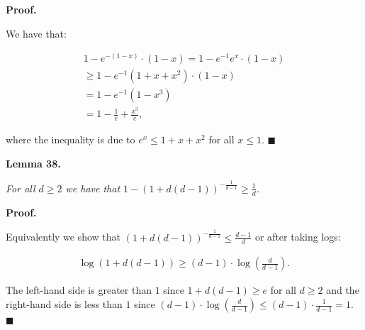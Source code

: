 


\par\medskip\noindent\textbf{Proof.}\par



We have that:\par


\[\begin{gathered}
\displaystyle 1-e^{-(1-x)}\cdot(1-x) \displaystyle=1-e^{-1}e^{x}\cdot(1-x) \\
\displaystyle\geq 1-e^{-1}(1+x+x^{2})\cdot(1-x) \\
\displaystyle=1-e^{-1}(1-x^{3}) \\
\displaystyle=1-\frac{1}{e}+\frac{x^{3}}{e},
\end{gathered}\]


where the inequality is due to $e^{x}\leq 1+x+x^{2}$ for all $x\leq 1$.
\ensuremath{\blacksquare}\par






\par\medskip\noindent\textbf{\textbf{Lemma 38}\textbf{.}}\par



\emph{For all $d\geq 2$ we have that $1-\left(1+d(d-1)\right)^{-\frac{1}{d-1}}\geq\frac{1}{d}$.}\par






\par\medskip\noindent\textbf{Proof.}\par



Equivalently we show that $\left(1+d(d-1)\right)^{-\frac{1}{d-1}}\leq\frac{d-1}{d}$ or after taking logs:\par


\[\begin{gathered}
\displaystyle\log\left(1+d(d-1)\right)\geq(d-1)\cdot\log\left(\frac{d}{d-1}\right).
\end{gathered}\]


The left-hand side is greater than $1$ since $1+d(d-1)\geq e$ for all $d\geq 2$ and the right-hand side is less than $1$ since $(d-1)\cdot\log\left(\frac{d}{d-1}\right)\leq(d-1)\cdot\frac{1}{d-1}=1$.
\ensuremath{\blacksquare}\par





